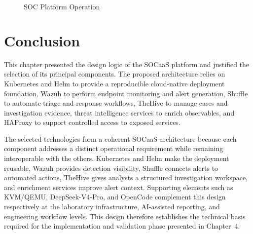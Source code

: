 \begin{figure}[H]
\centering
{}
\caption{SOC Platform Operation}
\label{fig:soc-operation}
\end{figure}

\section{Conclusion}
\label{sec:ch3-conclusion}

This chapter presented the design logic of the SOCaaS platform and justified the selection of its principal components. The proposed architecture relies on Kubernetes and Helm to provide a reproducible cloud-native deployment foundation, Wazuh to perform endpoint monitoring and alert generation, Shuffle to automate triage and response workflows, TheHive to manage cases and investigation evidence, threat intelligence services to enrich observables, and HAProxy to support controlled access to exposed services.

The selected technologies form a coherent SOCaaS architecture because each component addresses a distinct operational requirement while remaining interoperable with the others. Kubernetes and Helm make the deployment reusable, Wazuh provides detection visibility, Shuffle connects alerts to automated actions, TheHive gives analysts a structured investigation workspace, and enrichment services improve alert context. Supporting elements such as KVM/QEMU, DeepSeek-V4-Pro, and OpenCode complement this design respectively at the laboratory infrastructure, AI-assisted reporting, and engineering workflow levels. This design therefore establishes the technical basis required for the implementation and validation phase presented in Chapter~4.

